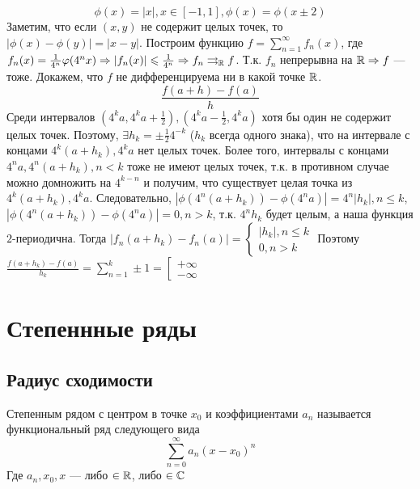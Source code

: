 
\begin{example}
    \[\phi(x) = |x|, x \in [-1, 1], \phi(x) = \phi(x \pm 2)\]
    Заметим, что если \((x, y)\) не содержит целых точек, то \(|\phi(x) - \phi(y)| = |x - y|\). Построим функцию \(f = \sum_{n = 1}^\infty f_n(x)\), где \(f_n(x) = \frac{1}{4^n}\varphi(4^nx) \Rightarrow |f_n(x)| \leqslant \frac{1}{4^n} \Rightarrow f_n \rightrightarrows_{\mathbb{R}} f\). Т.к. \(f_n\) непрерывна на \(\mathbb{R} \Rightarrow f\) --- тоже. Докажем, что \(f\) не дифференцируема ни в какой точке \(\mathbb{R}\).
    \[\frac{f(a + h) - f(a)}{h}\]
    Среди интервалов \(\left(4^ka, 4^ka + \frac{1}{2}\right), \left(4^ka - \frac{1}{2}, 4^ka\right)\) хотя бы один не содержит целых точек. Поэтому, \(\exists h_k = \pm \frac{1}{2}4^{-k}\) (\(h_k\) всегда одного знака), что на интервале с концами \(4^k(a + h_k), 4^ka\) нет целых точек. Более того, интервалы с концами \(4^na, 4^n(a + h_k), n < k\) тоже не имеют целых точек, т.к. в противном случае можно домножить на \(4^{k - n}\) и получим, что существует целая точка из \(4^k(a + h_k), 4^ka\). Следовательно,  \(|\phi(4^n(a + h_k)) - \phi(4^na)| = 4^n|h_k|, n \le k\), \(|\phi(4^n(a + h_k)) - \phi(4^na)| = 0, n > k\), т.к. \(4^nh_k\) будет целым, а наша функция \(2\)-периодична. Тогда \(|f_n(a + h_k) - f_n(a)| = \left\{\begin{array}{l}
        |h_k|, n \le k \\
        0, n > k
    \end{array}\right.\)
    Поэтому \(\frac{f(a + h_k) - f(a)}{h_k} = \sum_{n = 1}^k \pm 1 = \left[\begin{array}{l}
        +\infty \\
        -\infty
    \end{array}\right.\)
\end{example}

\section{Степеннные ряды}
\subsection{Радиус сходимости}

\begin{definition}
    Степенным рядом с центром в точке \(x_0\) и коэффициентами \(a_n\) называется функциональный ряд следующего вида 
    \[\sum_{n = 0}^\infty a_n(x - x_0)^n\]
    Где \(a_n, x_0, x\) --- либо \(\in \mathbb{R}\), либо \(\in \mathbb{C}\)
\end{definition}

